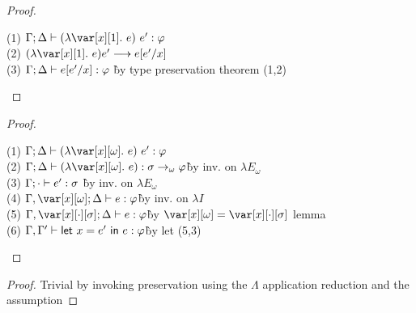 \BetaReductionTheorem

\begin{proof}~

\begin{tabbing}
    (1) $\G; \D \vdash (\lambda \xl.~e)~e' : \vp$\\
    (2) $(\lambda \xl.~e) e' \longrightarrow e[e'/x]$\\
    (3) $\Gamma; \Delta \vdash e[e'/x] : \varphi$ \` by type preservation theorem (1,2)\\

\end{tabbing}
\end{proof}

\BetaReductionSharingTheorem

\begin{proof}~

\begin{tabbing}
    (1) $\G;\D \vdash (\lambda \xo.~e)~e' : \vp$\\
    (2) $\G; \D \vdash (\lambda \xo.~e) : \s \to_\omega \vp$\` by inv. on $\lambda E_\omega$\\
    (3) $\Gamma; \cdot \vdash e' : \sigma$ \` by inv. on $\lambda E_\omega$\\
    (4) $\G,\xo; \D \vdash e : \vp$\` by inv. on $\lambda I$\\
    (5) $\G, \x[\cdot][\s]; \D \vdash e : \vp$\` by $\xo = \x[\cdot][\s]$ lemma\\
    (6) $\Gamma,\Gamma' \vdash \mathsf{let}~x = e'~\mathsf{in}~e : \varphi$\` by let (5,3)\\
\end{tabbing}
\end{proof}

\BetaReductionMultTheorem

\begin{proof}
    Trivial by invoking preservation using the $\Lambda$ application reduction and the assumption
\end{proof}


